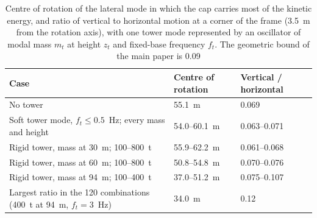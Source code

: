 \documentclass[11pt]{article}
\begin{document}
\begin{table}[htbp]
\centering
\caption{Centre of rotation of the lateral mode in which the cap carries most of the kinetic energy, and ratio of vertical to horizontal motion at a corner of the frame (3.5~m from the rotation axis), with one tower mode represented by an oscillator of modal mass $m_t$ at height $z_t$ and fixed-base frequency $f_t$. The geometric bound of the main paper is 0.09}
\label{tab:tower}
\begin{tabularx}{\linewidth}{@{}Lll@{}}
\toprule
Case & Centre of rotation & Vertical / horizontal \\
\midrule
No tower & 55.1~m & 0.069 \\
Soft tower mode, $f_t \leq 0.5$~Hz; every mass and height & 54.0--60.1~m & 0.063--0.071 \\
Rigid tower, mass at 30~m; 100--800~t & 55.9--62.2~m & 0.061--0.068 \\
Rigid tower, mass at 60~m; 100--800~t & 50.8--54.8~m & 0.070--0.076 \\
Rigid tower, mass at 94~m; 100--400~t & 37.0--51.2~m & 0.075--0.107 \\
Largest ratio in the 120 combinations (400~t at 94~m, $f_t = 3$~Hz) & 34.0~m & 0.12 \\
\bottomrule
\end{tabularx}
\end{table}
\end{document}
